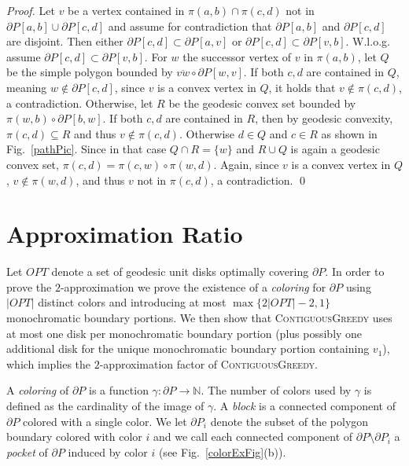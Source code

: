 \documentclass{llncs}
\begin{document}
\begin{proof}

Let $v$ be a vertex contained in $\pi(a,b) \cap \pi(c,d)$  not in $\partial P[a,b] \cup \partial P[c,d]$ and assume for contradiction that $\partial P[a,b] $ and $ \partial P[c,d]$ are disjoint. 
Then either $\partial P[c,d] \subset \partial P[a,v]$ or $\partial P[c,d] \subset \partial P[v,b]$. W.l.o.g.  assume  $\partial P[c,d] \subset \partial P[v,b]$. For $w$ the successor vertex of $v$ in $\pi(a,b)$, let $Q$ be the simple polygon bounded by $\overline{vw} \circ \partial P[w, v]$. If both $c,d$ are contained in $Q$, meaning $w \notin \partial P[c,d]$, since $v$ is a convex vertex in $Q$, it holds that $ v \notin \pi(c,d)$, a contradiction. Otherwise, let $R$ be the geodesic convex set bounded by $\pi(w, b) \circ \partial P[b, w]$. If both $c,d$ are contained in $R$, then by geodesic convexity, $\pi(c,d) \subseteq R$ and thus $v \notin \pi(c,d)$. Otherwise $d \in Q$ and $c \in R$ as shown in Fig.~\ref{pathPic}. Since in that case $Q \cap  R = \{w\}$ and $R \cup Q$ is again a geodesic convex set, $\pi(c,d) =\pi(c,w) \circ \pi(w,d)$. Again, since $v$ is a convex vertex in $Q$, $v \notin \pi(w,d)$, and thus $v$ not in $\pi(c,d)$, a contradiction.
\qed


\end{proof}







\section{Approximation Ratio}
\label{approx}

Let $OPT$ denote a set of geodesic unit disks optimally covering $\partial P$. In order to prove the $2$-approximation we prove the existence of a {\em coloring} for  $\partial P$ using $|OPT|$ distinct colors and introducing at most $\max\{2|OPT| - 2,1\}$ monochromatic boundary portions. We then show that  \textsc{ContiguousGreedy} uses at most one disk per monochromatic boundary portion (plus possibly one additional disk for the unique monochromatic boundary portion containing $v_1$), which implies the $2$-approximation factor of  \textsc{ContiguousGreedy}. 

{A {\em coloring} of $\partial P$ is a function $\gamma: \partial P \rightarrow \mathbb{N}$.  The number of colors used by $\gamma$ is defined as the cardinality of the image of $\gamma$}. A {\em block} is a connected component of $\partial P$ colored with a single color.  We let $\partial P_i$ denote the subset of the polygon boundary colored with color $i$ and we call each connected component of $ \partial P \setminus \partial P_i$ a \emph{pocket} of $\partial P$ induced by {color} $i$ (see Fig.~\ref{colorExFig}(b)). 
\end{document}
